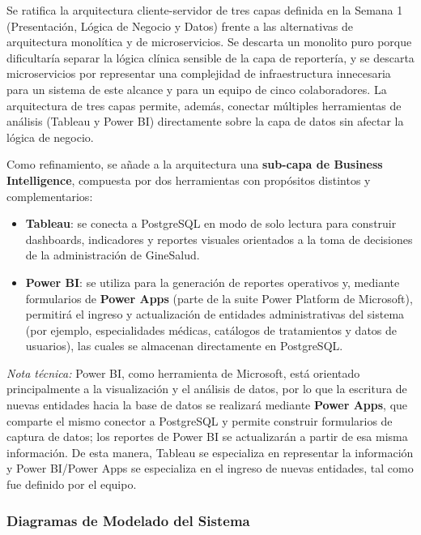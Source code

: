 \documentclass[12pt,letterpaper]{article}
\begin{document}
Se ratifica la arquitectura cliente-servidor de tres capas definida en la Semana 1 (Presentación,
Lógica de Negocio y Datos) frente a las alternativas de arquitectura monolítica y de
microservicios. Se descarta un monolito puro porque dificultaría separar la lógica clínica
sensible de la capa de reportería, y se descarta microservicios por representar una
complejidad de infraestructura innecesaria para un sistema de este alcance y para un equipo
de cinco colaboradores. La arquitectura de tres capas permite, además, conectar múltiples
herramientas de análisis (Tableau y Power BI) directamente sobre la capa de datos sin
afectar la lógica de negocio.

Como refinamiento, se añade a la arquitectura una \textbf{sub-capa de Business Intelligence},
compuesta por dos herramientas con propósitos distintos y complementarios:

\begin{itemize}
    \item \textbf{Tableau}: se conecta a PostgreSQL en modo de solo lectura para construir
    dashboards, indicadores y reportes visuales orientados a la toma de decisiones de la
    administración de GineSalud.
    \item \textbf{Power BI}: se utiliza para la generación de reportes operativos y, mediante
    formularios de \textbf{Power Apps} (parte de la suite Power Platform de Microsoft),
    permitirá el ingreso y actualización de entidades administrativas del sistema (por
    ejemplo, especialidades médicas, catálogos de tratamientos y datos de usuarios), las
    cuales se almacenan directamente en PostgreSQL.
\end{itemize}

\textit{Nota técnica:} Power BI, como herramienta de Microsoft, está orientado
principalmente a la visualización y el análisis de datos, por lo que la escritura de nuevas
entidades hacia la base de datos se realizará mediante \textbf{Power Apps}, que comparte
el mismo conector a PostgreSQL y permite construir formularios de captura de datos; los
reportes de Power BI se actualizarán a partir de esa misma información. De esta manera,
Tableau se especializa en representar la información y Power BI/Power Apps se especializa
en el ingreso de nuevas entidades, tal como fue definido por el equipo.

\subsubsection*{Diagramas de Modelado del Sistema}
\end{document}
